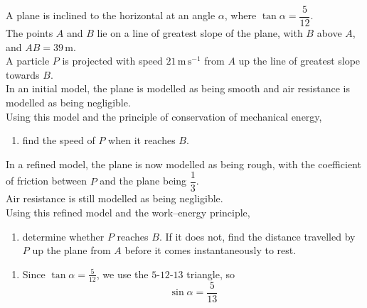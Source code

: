 \documentclass[leqno]{article}
\begin{document}
\begin{enumerate}[
  label=\textbf{\arabic*.},
  leftmargin=*,
  topsep=0pt,
  partopsep=0pt,
  parsep=0pt
]
\newpage

\questionitem

A plane is inclined to the horizontal at an angle $\alpha$, where $\tan\alpha=\dfrac{5}{12}$. \\

The points $A$ and $B$ lie on a line of greatest slope of the plane, with $B$ above $A$, and $AB=39\,\mathrm{m}$. \\

A particle $P$ is projected with speed $21\,\mathrm{m\,s^{-1}}$ from $A$ up the line of greatest slope towards $B$. \\

In an initial model, the plane is modelled as being smooth and air resistance is modelled as being negligible. \\

Using this model and the principle of conservation of mechanical energy, \\

\begin{enumerate}[label=\textbf{(\alph*)}]
  \item find the speed of $P$ when it reaches $B$.  \\
\end{enumerate}

In a refined model, the plane is now modelled as being rough, with the coefficient of friction between $P$ and the plane being $\dfrac{1}{3}$. \\

Air resistance is still modelled as being negligible. \\

Using this refined model and the work--energy principle, \\

\begin{enumerate}[label=\textbf{(\alph*)}, resume]
  \item determine whether $P$ reaches $B$. If it does not, find the distance travelled by $P$ up the plane from $A$ before it comes instantaneously to rest.  \\
\end{enumerate}

\vspace*{10pt}

\begin{djsSolution}
\begin{enumerate}[label=\textbf{(\alph*)}]
  \item Since $\tan\alpha=\frac{5}{12}$, we use the $5$-$12$-$13$ triangle, so
  \[
  \sin\alpha=\frac{5}{13}
  \]


\end{enumerate}
\end{djsSolution}
\end{enumerate}
\end{document}
